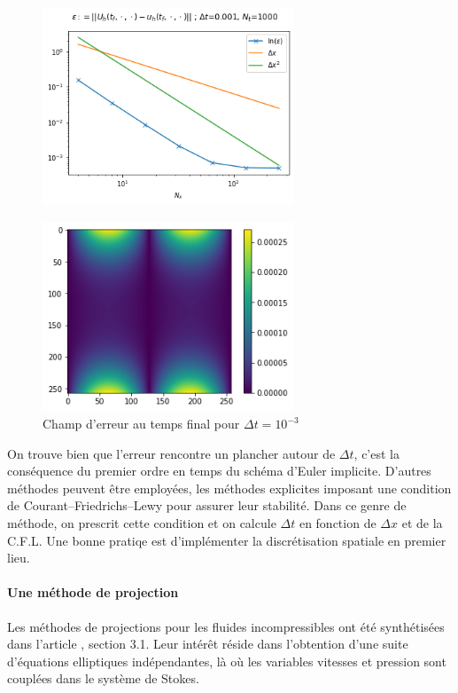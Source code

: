 \begin{figure}[htp]
    \centering
    \includegraphics[width=7.5cm]{Images/stokes/Parbolique 2D/analyse 3.png}
    \caption{}
\end{figure}

\begin{figure}[htp]
    \centering
    \includegraphics[width=7.5cm]{Images/stokes/Parbolique 2D/erreur 3.png}
    \caption{Champ d'erreur au temps final pour $\Delta t = 10^{-3}$}
\end{figure}

On trouve bien que l'erreur rencontre un plancher autour de $\Delta t$, c'est la conséquence du premier ordre en temps du schéma d'Euler implicite. D'autres méthodes peuvent être employées, les méthodes explicites imposant une condition de Courant–Friedrichs–Lewy pour assurer leur stabilité. Dans ce genre de méthode, on prescrit cette condition et on calcule $\Delta t$ en fonction de $\Delta x$ et de la C.F.L. Une bonne pratiqe est d'implémenter la discrétisation spatiale en premier lieu.

\paragraph{Une méthode de projection} Les méthodes de projections pour les fluides incompressibles ont été synthétisées dans l'article \cite{guermond}, section 3.1. Leur intérêt réside dans l'obtention d'une suite d'équations elliptiques indépendantes, là où les variables vitesses et pression sont couplées dans le système de Stokes.

